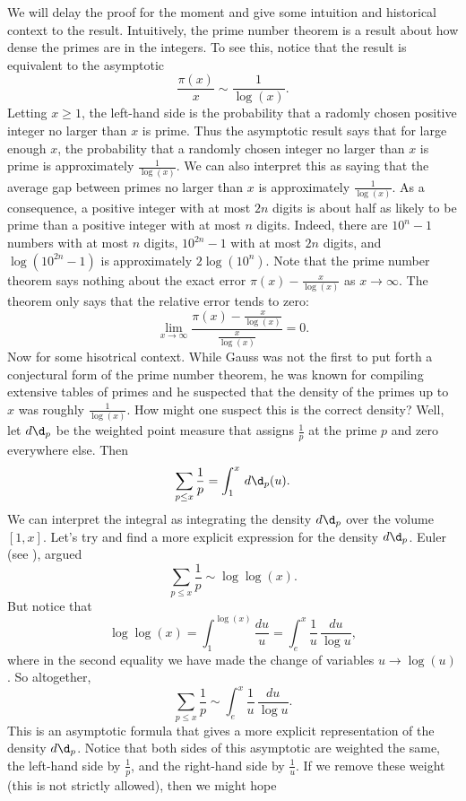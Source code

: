       We will delay the proof for the moment and give some intuition and historical context to the result. Intuitively, the prime number theorem is a result about how dense the primes are in the integers. To see this, notice that the result is equivalent to the asymptotic
      \[
        \frac{\pi(x)}{x} \sim \frac{1}{\log(x)}.
      \]
      Letting $x \ge 1$, the left-hand side is the probability that a radomly chosen positive integer no larger than $x$ is prime. Thus the asymptotic result says that for large enough $x$, the probability that a randomly chosen integer no larger than $x$ is prime is approximately $\frac{1}{\log(x)}$. We can also interpret this as saying that the average gap between primes no larger than $x$ is approximately $\frac{1}{\log(x)}$. As a consequence, a positive integer with at most $2n$ digits is about half as likely to be prime than a positive integer with at most $n$ digits. Indeed, there are $10^{n}-1$ numbers with at most $n$ digits, $10^{2n}-1$ with at most $2n$ digits, and $\log(10^{2n}-1)$ is approximately $2\log(10^{n})$. Note that the prime number theorem says nothing about the exact error $\pi(x)-\frac{x}{\log(x)}$ as $x \to \infty$. The theorem only says that the relative error tends to zero:
      \[
        \lim_{x \to \infty}\frac{\pi(x)-\frac{x}{\log(x)}}{\frac{x}{\log(x)}} = 0.
      \]
      Now for some hisotrical context. While Gauss was not the first to put forth a conjectural form of the prime number theorem, he was known for compiling extensive tables of primes and he suspected that the density of the primes up to $x$ was roughly $\frac{1}{\log(x)}$. How might one suspect this is the correct density? Well, let $d\d_{p}$ be the weighted point measure that assigns $\frac{1}{p}$ at the prime $p$ and zero everywhere else. Then
      \[
        \sum_{p \le x}\frac{1}{p} = \int_{1}^{x}\,d\d_{p}(u).
      \]
      We can interpret the integral as integrating the density $d\d_{p}$ over the volume $[1,x]$. Let's try and find a more explicit expression for the density $d\d_{p}$. Euler (see \cite{euler1744variae}), argued
      \[
        \sum_{p \le x}\frac{1}{p} \sim \log\log(x).
      \]
      But notice that
      \[
        \log\log(x) = \int_{1}^{\log(x)}\frac{du}{u} = \int_{e}^{x}\frac{1}{u}\,\frac{du}{\log{u}},
      \]
      where in the second equality we have made the change of variables $u \to \log(u)$. So altogether,
      \[
        \sum_{p \le x}\frac{1}{p} \sim \int_{e}^{x}\frac{1}{u}\,\frac{du}{\log{u}}.
      \]
      This is an asymptotic formula that gives a more explicit representation of the density $d\d_{p}$. Notice that both sides of this asymptotic are weighted the same, the left-hand side by $\frac{1}{p}$, and the right-hand side by $\frac{1}{u}$. If we remove these weight (this is not strictly allowed), then we might hope
